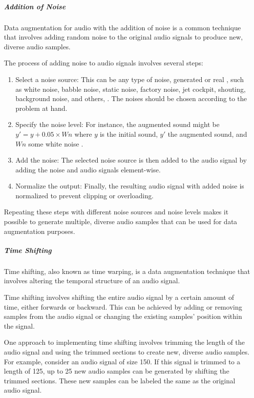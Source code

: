 \subparagraph{Addition of Noise}
Data augmentation for audio with the addition of noise is a common technique that involves adding random noise to the original audio signals to produce new, diverse audio samples.

The process of adding noise to audio signals involves several steps:

\begin{enumerate}
    \item Select a noise source: This can be any type of noise, generated or real \cite{novotny_analysis_2019}, such as white noise, babble noise, static noise, factory noise, jet cockpit, shouting, background noise, and others, \cite{abayomi-alli_data_2022}. The noises should be chosen according to the problem at hand.
    \item Specify the noise level: For instance, the augmented sound might be $y' = y + 0.05 \times Wn$ where $y$ is the initial sound, $y'$ the augmented sound, and $Wn$ some white noise \cite{mushtaq_environmental_2020}.
    \item Add the noise: The selected noise source is then added to the audio signal by adding the noise and audio signals element-wise.
    \item Normalize the output: Finally, the resulting audio signal with added noise is normalized to prevent clipping or overloading.
\end{enumerate}

Repeating these steps with different noise sources and noise levels makes it possible to generate multiple, diverse audio samples that can be used for data augmentation purposes.

\subparagraph{Time Shifting} \label{sec:time-shifting}
Time shifting, also known as time warping, is a data augmentation technique that involves altering the temporal structure of an audio signal.

Time shifting involves shifting the entire audio signal by a certain amount of time, either forwards or backward. This can be achieved by adding or removing samples from the audio signal or changing the existing samples' position within the signal.

One approach to implementing time shifting involves trimming the length of the audio signal and using the trimmed sections to create new, diverse audio samples. For example, consider an audio signal of size 150. If this signal is trimmed to a length of 125, up to 25 new audio samples can be generated by shifting the trimmed sections. These new samples can be labeled the same as the original audio signal.

